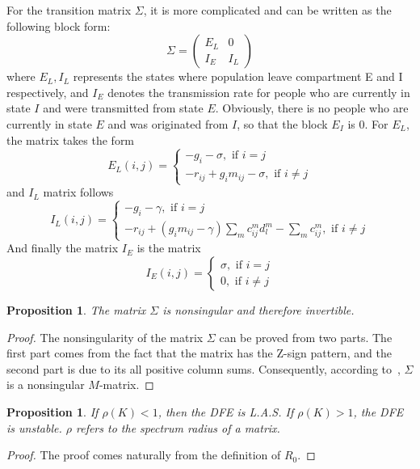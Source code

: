 \documentclass[review]{elsarticle}
\theoremstyle{plain}
\newtheorem{proposition}[theorem]{Proposition}
\theoremstyle{definition}
\theoremstyle{remark}
\numberwithin{equation}{section}
\theoremstyle{remark}
\begin{document}
For the transition matrix $\Sigma$, it is more complicated and can be written as the following block form:
\begin{equation}
\Sigma=\begin{pmatrix}
E_L & 0 \\
I_E & I_L
\end{pmatrix}
\end{equation}
where $E_L,I_L$ represents the states where population leave compartment E and I respectively, and $I_E$ denotes the transmission rate for people who are currently in state $I$ and were transmitted from state $E$. Obviously, there is no people who are currently in state $E$ and was originated from $I$, so that the block $E_I$ is $0$. For $E_L$, the matrix takes the form
\begin{equation}
E_L(i,j)=\begin{cases}
-g_i-\sigma, \text{ if $i=j$}\\
-r_{ij}+g_im_{ij}-\sigma, \text{  if $i\neq j$}
\end{cases}
\end{equation}
and $I_L$ matrix follows
\begin{equation}
I_L(i,j)=\begin{cases}
-g_i-\gamma, \text{ if $i=j$}\\
-r_{ij}+(g_im_{ij}-\gamma)\sum_m c_{ij}^md_l^m-\sum_m c_{ij}^m, \text{  if $i\neq j$}
\end{cases}
\end{equation}
And finally the matrix $I_E$ is the matrix 
\begin{equation}
I_E(i,j)=\begin{cases}
\sigma, \text{  if $i=j$}\\
0, \text{  if $i\neq j$}
\end{cases}
\end{equation}
\begin{proposition}
	The matrix $\Sigma$ is nonsingular and therefore invertible.
\end{proposition}
\begin{proof}
	The nonsingularity of the matrix $\Sigma$ can be proved from two parts. The first part comes from the fact that the matrix has the Z-sign pattern, and the second part is due to its all positive column sums. Consequently, according to~\cite{berman1979nonnegative}, $\Sigma$ is a nonsingular $M$-matrix. 
\end{proof}
\begin{proposition}
	If $\rho(K)<1$, then the DFE is L.A.S. If $\rho(K)>1$, the DFE is unstable. $\rho$ refers to the spectrum radius of a matrix.  
\end{proposition}
\begin{proof}
	The proof comes naturally from the definition of $R_0$. 
\end{proof}
\end{document}
